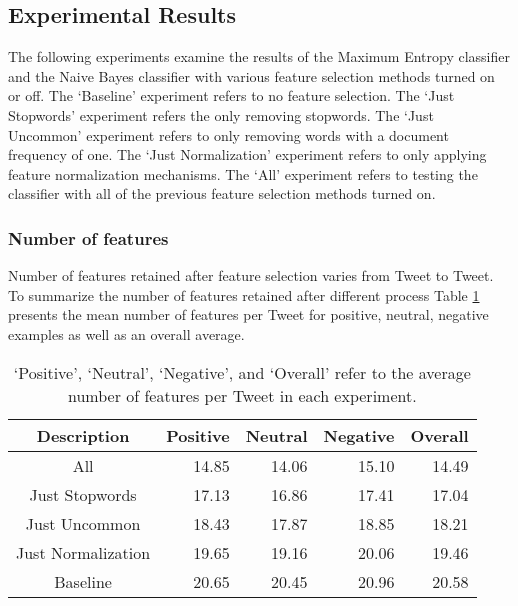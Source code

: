 \documentclass[final,3p,12pt]{elsarticle}
\begin{document}
\subsection{Experimental Results}
\label{ssection:results}

The following experiments examine the results of the Maximum Entropy classifier
and the Naive Bayes classifier with various feature selection methods turned on
or off. The `Baseline' experiment refers to no feature selection. The `Just
Stopwords' experiment refers the only removing stopwords. The `Just Uncommon'
experiment refers to only removing words with a document frequency of one. The
`Just Normalization' experiment refers to only applying feature normalization
mechanisms. The `All' experiment refers to testing the classifier with all of
the previous feature selection methods turned on.

\subsubsection{Number of features}
\label{ssection:numfeatures}

Number of features retained after feature selection varies from Tweet to Tweet.
To summarize the number of features retained after different process Table
\ref{table:numfeatures} presents the mean number of features per Tweet for
positive, neutral, negative examples as well as an overall average.

\begin{table}[H]
    \begin{center}
    \begin{tabular}{|c||r|r|r|r|}
        \hline
        Description        & Positive & Neutral & Negative & Overall \\
        \hline
        All                & 14.85    & 14.06   & 15.10    & 14.49 \\
        Just Stopwords     & 17.13    & 16.86   & 17.41    & 17.04 \\
        Just Uncommon      & 18.43    & 17.87   & 18.85    & 18.21 \\
        Just Normalization & 19.65    & 19.16   & 20.06    & 19.46 \\
        Baseline           & 20.65    & 20.45   & 20.96    & 20.58 \\
        \hline
    \end{tabular}
    \end{center}
    \caption{`Positive', `Neutral', `Negative', and `Overall' refer to the
    average number of features per Tweet in each experiment.}
    \label{table:numfeatures}
\end{table}
\end{document}
